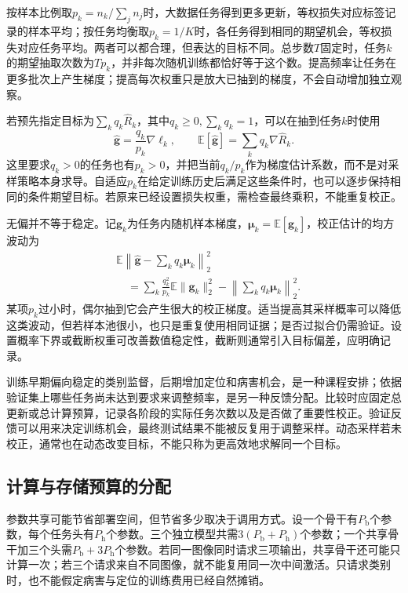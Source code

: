 按样本比例取$p_k=n_k/\sum_jn_j$时，大数据任务得到更多更新，等权损失对应标签记录的样本平均；按任务均衡取$p_k=1/K$时，各任务得到相同的期望机会，等权损失对应任务平均。两者可以都合理，但表达的目标不同。总步数$T$固定时，任务$k$的期望抽取次数为$Tp_k$，并非每次随机训练都恰好等于这个数。提高频率让任务在更多批次上产生梯度；提高每次权重只是放大已抽到的梯度，不会自动增加独立观察。

若预先指定目标为$\sum_kq_k\hat R_k$，其中$q_k\geq0,\sum_kq_k=1$，可以在抽到任务$k$时使用
\begin{equation}
  \widehat{\bm g}
  =\frac{q_k}{p_k}\nabla\ell_k,
  \qquad
  \mathbb E[\widehat{\bm g}]
  =\sum_kq_k\nabla\hat R_k.
  \label{eq:ket-sharing-importance-sampling}
\end{equation}
这里要求$q_k>0$的任务也有$p_k>0$，并把当前$q_k/p_k$作为梯度估计系数，而不是对采样策略本身求导。自适应$p_k$在给定训练历史后满足这些条件时，也可以逐步保持相同的条件期望目标。若原来已经设置损失权重，需检查最终乘积，不能重复校正。

无偏并不等于稳定。记$\bm g_k$为任务内随机样本梯度，$\bm\mu_k=\mathbb E[\bm g_k]$，校正估计的均方波动为
\begin{align}
  &\mathbb E\left\|
    \widehat{\bm g}-\sum_kq_k\bm\mu_k
  \right\|_2^2
  \nonumber\\
  &\quad=
  \sum_k\frac{q_k^2}{p_k}\mathbb E\|\bm g_k\|_2^2
  -\left\|\sum_kq_k\bm\mu_k\right\|_2^2.
  \label{eq:ket-sharing-sampling-variance}
\end{align}
某项$p_k$过小时，偶尔抽到它会产生很大的校正梯度。适当提高其采样概率可以降低这类波动，但若样本池很小，也只是重复使用相同证据；是否过拟合仍需验证。设置概率下界或截断权重可改善数值稳定性，截断则通常引入目标偏差，应明确记录。

训练早期偏向稳定的类别监督，后期增加定位和病害机会，是一种课程安排；依据验证集上哪些任务尚未达到要求来调整频率，是另一种反馈分配。比较时应固定总更新或总计算预算，记录各阶段的实际任务次数以及是否做了重要性校正。验证反馈可以用来决定训练机会，最终测试结果不能被反复用于调整采样。动态采样若未校正，通常也在动态改变目标，不能只称为更高效地求解同一个目标。

\subsection{计算与存储预算的分配}
\label{sec:ket-sharing-budget}

参数共享可能节省部署空间，但节省多少取决于调用方式。设一个骨干有$P_{\mathrm b}$个参数，每个任务头有$P_{\mathrm h}$个参数。三个独立模型共需$3(P_{\mathrm b}+P_{\mathrm h})$个参数；一个共享骨干加三个头需$P_{\mathrm b}+3P_{\mathrm h}$个参数。若同一图像同时请求三项输出，共享骨干还可能只计算一次；若三个请求来自不同图像，就不能复用同一次中间激活。只请求类别时，也不能假定病害与定位的训练费用已经自然摊销。

